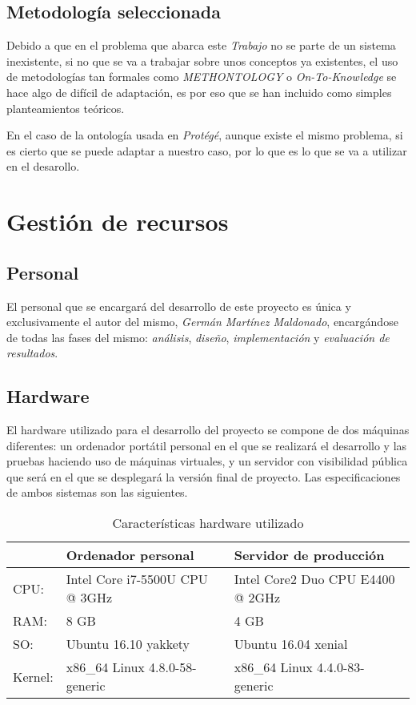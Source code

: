 \subsection{Metodología seleccionada}

Debido a que en el problema que abarca este {\it Trabajo} no se parte de un sistema inexistente, si no que se va a trabajar sobre unos conceptos ya existentes, el uso de metodologías tan formales como {\it METHONTOLOGY} o {\it On-To-Knowledge} se hace algo de difícil de adaptación, es por eso que se han incluido como simples planteamientos teóricos.

\bigskip
En el caso de la ontología usada en {\it Protégé}, aunque existe el mismo problema, si es cierto que se puede adaptar a nuestro caso, por lo que es lo que se va a utilizar en el desarollo.

\section{Gestión de recursos}

\subsection{Personal}

El personal que se encargará del desarrollo de este proyecto es única y exclusivamente el autor del mismo, {\it Germán Martínez Maldonado}, encargándose de todas las fases del mismo: \textit{análisis}, \textit{diseño}, \textit{implementación} y \textit{evaluación de resultados}.

\subsection{Hardware}

El hardware utilizado para el desarrollo del proyecto se compone de dos máquinas diferentes: un ordenador portátil personal en el que se realizará el desarrollo y las pruebas haciendo uso de máquinas virtuales, y un servidor con visibilidad pública que será en el que se desplegará la versión final de proyecto. Las especificaciones de ambos sistemas son las siguientes.

\begin{table}[!ht]
	\centering
	\begin{tabular}{|p{}|p{}|p{}|}
		\hline
		 &
		\textbf{Ordenador personal}&
		\textbf{Servidor de producción}
		\\ \hline
		CPU:&
		Intel Core i7-5500U CPU @ 3GHz&
		Intel Core2 Duo CPU E4400 @ 2GHz
		\\ \hline
		RAM:&
		8 GB&
		4 GB
		\\ \hline
		SO:&
		Ubuntu 16.10 yakkety&
		Ubuntu 16.04 xenial
		\\ \hline
		Kernel:&
		x86\_64 Linux 4.8.0-58-generic&
		x86\_64 Linux 4.4.0-83-generic
		\\ \hline
	\end{tabular}
	\caption{Características hardware utilizado}
	\label{caracteristicas-hardware}
\end{table}

